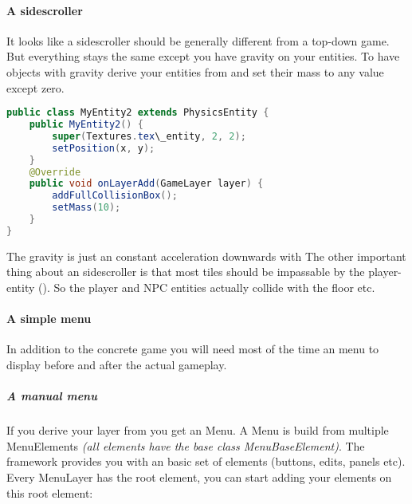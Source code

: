 \paragraph{A sidescroller}

It looks like a sidescroller should be generally different from a top-down game. But everything stays the same except you have gravity on your entities.
To have objects with gravity derive your entities from  and set their mass to any value except zero.

\doinline
\begin{lstlisting}[caption=Markdown Tutorial: fenced code block, title=\hspace{0 pt}, language=java]
public class MyEntity2 extends PhysicsEntity {
	public MyEntity2() {
		super(Textures.tex\_entity, 2, 2);
		setPosition(x, y);
	}
	@Override
	public void onLayerAdd(GameLayer layer) {
		addFullCollisionBox();
		setMass(10);
	}
}
\end{lstlisting}

The gravity is just an constant acceleration downwards with 
The other important thing about an sidescroller is  that most tiles should be impassable by the player-entity (). So the player and NPC entities actually collide with the floor etc.

\paragraph{A simple menu}

In addition to the concrete game you will need most of the time an menu to display before and after the actual gameplay.

\subparagraph{A manual menu}

If you derive your layer from  you get an Menu. A Menu is build from multiple MenuElements \textit{(all elements have the base class MenuBaseElement)}.
The framework provides you with an basic set of elements (buttons, edits, panels etc). Every MenuLayer has the root element, you can start adding your elements on this root element:

